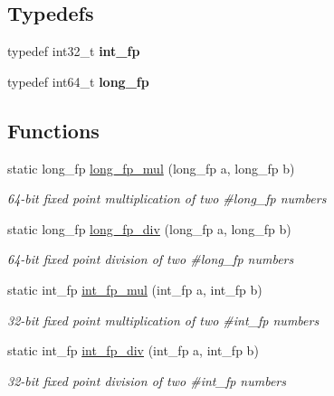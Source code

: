 \subsection*{Typedefs}
\begin{DoxyCompactItemize}
\item 
typedef int32\+\_\+t {\bfseries int\+\_\+fp}\hypertarget{gcl-fixedpoint_8h_aa1a10f568b12a36dbfe95583fbbbe35a}{}\label{gcl-fixedpoint_8h_aa1a10f568b12a36dbfe95583fbbbe35a}

\item 
typedef int64\+\_\+t {\bfseries long\+\_\+fp}\hypertarget{gcl-fixedpoint_8h_abd8cbe1f4521c00730f7a9931b198281}{}\label{gcl-fixedpoint_8h_abd8cbe1f4521c00730f7a9931b198281}

\end{DoxyCompactItemize}
\subsection*{Functions}
\begin{DoxyCompactItemize}
\item 
static long\+\_\+fp \hyperlink{gcl-fixedpoint_8h_ad45629d9a653818caf57b313d4a8d7c3}{long\+\_\+fp\+\_\+mul} (long\+\_\+fp a, long\+\_\+fp b)
\begin{DoxyCompactList}\small\item\em 64-\/bit fixed point multiplication of two \#long\+\_\+fp numbers \end{DoxyCompactList}\item 
static long\+\_\+fp \hyperlink{gcl-fixedpoint_8h_ab5f92bb60e66fda1d36981c1df6563ea}{long\+\_\+fp\+\_\+div} (long\+\_\+fp a, long\+\_\+fp b)
\begin{DoxyCompactList}\small\item\em 64-\/bit fixed point division of two \#long\+\_\+fp numbers \end{DoxyCompactList}\item 
static int\+\_\+fp \hyperlink{gcl-fixedpoint_8h_aae0a3c76fcea84dc584a115420a9466b}{int\+\_\+fp\+\_\+mul} (int\+\_\+fp a, int\+\_\+fp b)
\begin{DoxyCompactList}\small\item\em 32-\/bit fixed point multiplication of two \#int\+\_\+fp numbers \end{DoxyCompactList}\item 
static int\+\_\+fp \hyperlink{gcl-fixedpoint_8h_ac7b70a1b6980b5da47e896f5d97ee8a2}{int\+\_\+fp\+\_\+div} (int\+\_\+fp a, int\+\_\+fp b)
\begin{DoxyCompactList}\small\item\em 32-\/bit fixed point division of two \#int\+\_\+fp numbers \end{DoxyCompactList}\end{DoxyCompactItemize}


